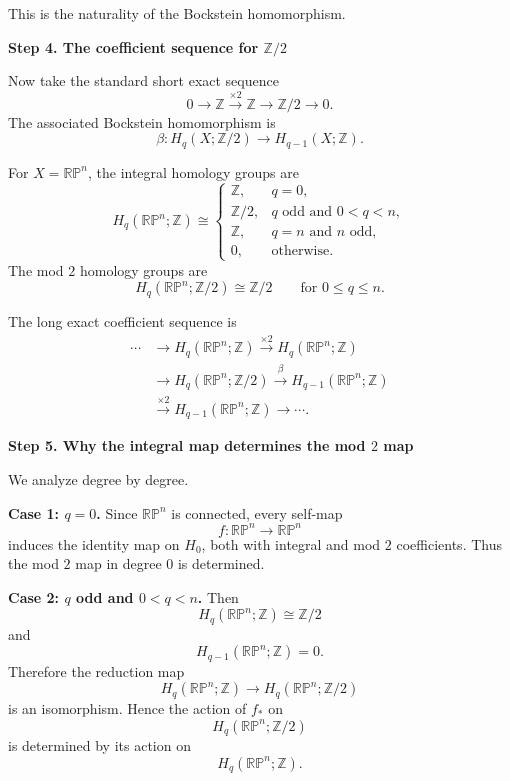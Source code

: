 \begin{solution}
This is the naturality of the Bockstein homomorphism.


\medskip
\noindent\textbf{Step 4. The coefficient sequence for \(\mathbb{Z}/2\)}\par
\smallskip


Now take the standard short exact sequence
\[
0\longrightarrow \mathbb Z
\xrightarrow{\times 2}
\mathbb Z
\longrightarrow
\mathbb Z/2
\longrightarrow 0.
\]
The associated Bockstein homomorphism is
\[
\beta:
H_q(X;\mathbb Z/2)
\longrightarrow
H_{q-1}(X;\mathbb Z).
\]

For \(X=\mathbb{RP}^n\), the integral homology groups are
\[
H_q(\mathbb{RP}^n;\mathbb Z)
\cong
\begin{cases}
	\mathbb Z, & q=0,\\[1mm]
	\mathbb Z/2, & q \text{ odd and } 0<q<n,\\[1mm]
	\mathbb Z, & q=n \text{ and } n \text{ odd},\\[1mm]
	0, & \text{otherwise}.
\end{cases}
\]
The mod \(2\) homology groups are
\[
H_q(\mathbb{RP}^n;\mathbb Z/2)
\cong
\mathbb Z/2
\qquad
\text{for }0\le q\le n.
\]

The long exact coefficient sequence is
\[
\begin{aligned}
\cdots&\longrightarrow H_q(\mathbb{RP}^n;\mathbb Z)
\xrightarrow{\times 2}H_q(\mathbb{RP}^n;\mathbb Z)\\
&\longrightarrow H_q(\mathbb{RP}^n;\mathbb Z/2)
\xrightarrow{\beta}H_{q-1}(\mathbb{RP}^n;\mathbb Z)\\
&\xrightarrow{\times 2}H_{q-1}(\mathbb{RP}^n;\mathbb Z)
\longrightarrow\cdots .
\end{aligned}
\]


\medskip
\noindent\textbf{Step 5. Why the integral map determines the mod \(2\) map}\par
\smallskip


We analyze degree by degree.

\par

\textbf{Case 1: \(q=0\).}
Since \(\mathbb{RP}^n\) is connected, every self-map
\[
f:\mathbb{RP}^n\longrightarrow \mathbb{RP}^n
\]
induces the identity map on \(H_0\), both with integral and mod \(2\) coefficients. Thus the mod \(2\) map in degree \(0\) is determined.

\par

\textbf{Case 2: \(q\) odd and \(0<q<n\).}
Then
\[
H_q(\mathbb{RP}^n;\mathbb Z)\cong \mathbb Z/2
\]
and
\[
H_{q-1}(\mathbb{RP}^n;\mathbb Z)=0.
\]
Therefore the reduction map
\[
H_q(\mathbb{RP}^n;\mathbb Z)
\longrightarrow
H_q(\mathbb{RP}^n;\mathbb Z/2)
\]
is an isomorphism. Hence the action of \(f_*\) on
\[
H_q(\mathbb{RP}^n;\mathbb Z/2)
\]
is determined by its action on
\[
H_q(\mathbb{RP}^n;\mathbb Z).
\]


\end{solution}
